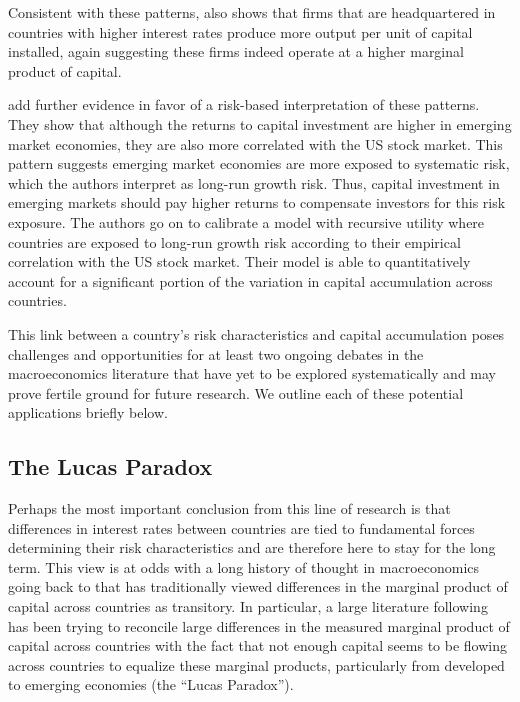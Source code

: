 \documentclass[11pt]{article}
\begin{document}
Consistent with these patterns, \citet{Richers2020} also shows that firms that are headquartered in countries with higher interest rates produce more output per unit of capital installed, again suggesting these firms indeed operate at a higher marginal product of capital.

\citet{DavidHenriksenSimonovska2014} add further evidence in favor of a risk-based interpretation of these patterns. They show that although the returns to capital investment are higher in emerging market economies, they are also more correlated with the US stock market. This pattern suggests emerging market economies are more exposed to systematic risk, which the authors interpret as long-run growth risk. Thus, capital investment in emerging markets should pay higher returns to compensate investors for this risk exposure. The authors go on to calibrate a model with recursive utility where countries are exposed to long-run growth risk according to their empirical correlation with the US stock market. Their model is able to quantitatively account for a significant portion of the variation in capital accumulation across countries.

This link between a country's risk characteristics and capital accumulation poses challenges and opportunities for at least two ongoing debates in the macroeconomics literature that have yet to be explored systematically and may prove fertile ground for future research. We outline each of these potential applications briefly below.

\subsection{The Lucas Paradox}

Perhaps the most important conclusion from this line of research is that differences in interest rates between countries are tied to fundamental forces determining their risk characteristics and are therefore here to stay for the long term. This view is at odds with a long history of thought in macroeconomics going back to \cite{solow1956contribution} that has traditionally viewed differences in the marginal product of capital across countries as transitory. In particular, a large literature following \citet{Lucas1990} has been trying to reconcile large differences in the measured marginal product of capital across countries with the fact that not enough capital seems to be flowing across countries to equalize these marginal products, particularly from developed to emerging economies (the ``Lucas Paradox''). 
\end{document}
